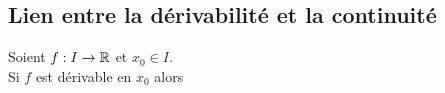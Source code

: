 \documentclass[a4paper, 11pt]{article}
\begin{document}
\vspace{0.3cm}

%
%
%
%
%
%
%


\subsection{Lien entre la d\'erivabilit\'e et la continuit\'e}

{\noindent

	\begin{prop} Soient $f: I\rightarrow \mathbb{R}$ et $x_0\in I$.\vsec\\
		\noindent  Si $f$ est d\'erivable en $x_0$ alors \dotfill  \vsec
	\end{prop}
}
\end{document}
